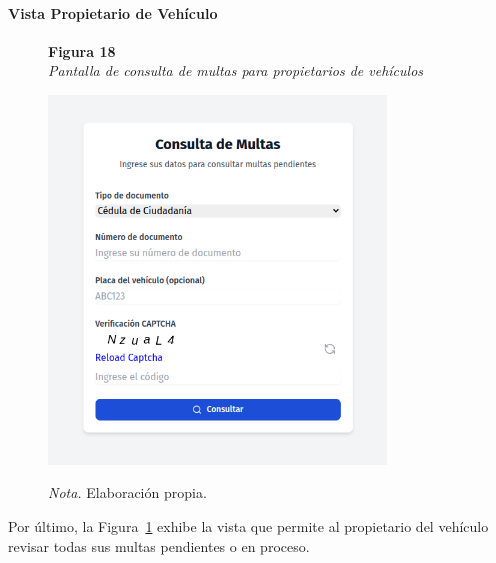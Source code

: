  \paragraph{Vista Propietario de Vehículo}
 \begin{figure}[htbp]
    \begin{flushleft}
        \textbf{Figura 18}\\[2em]
        \textit{Pantalla de consulta de multas para propietarios de vehículos}
    \end{flushleft}
    \vspace{1em}
    \centering
    \includegraphics[width=0.8\textwidth]{Images/UI5.png}
    \vspace{2em}
    \begin{flushleft}
        \textit{Nota.} Elaboración propia.
    \end{flushleft}
    \label{fig:consulta_multas_propietario}
\end{figure}
Por último, la Figura~\ref{fig:consulta_multas_propietario} exhibe la vista que permite al propietario del vehículo revisar todas sus multas pendientes o en proceso. 